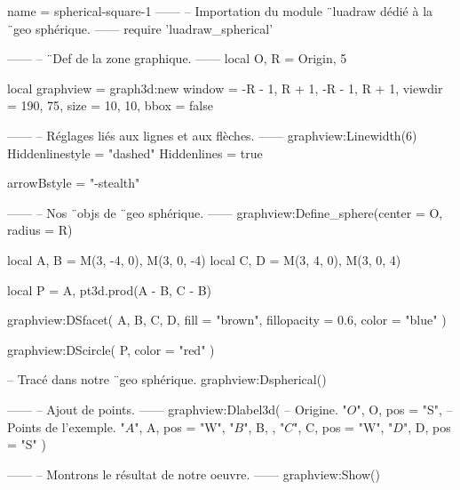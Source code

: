 \documentclass[border = 3pt]{standalone}
\begin{document}
\begin{luadraw*}{name = spherical-square-1}
------
-- Importation du module ¨luadraw dédié à la ¨geo sphérique.
------
require 'luadraw_spherical'

------
-- ¨Def de la zone graphique.
------
local O, R = Origin, 5

local graphview = graph3d:new{
  window  = {-R - 1, R + 1, -R - 1, R + 1},
  viewdir = {190, 75},
  size    = {10, 10},
  bbox    = false
}

------
-- Réglages liés aux lignes et aux flèches.
------
graphview:Linewidth(6)
Hiddenlinestyle = "dashed"
Hiddenlines     = true

arrowBstyle = "-stealth"

------
-- Nos ¨objs de ¨geo sphérique.
------
graphview:Define_sphere({center = O, radius = R})

local A, B = M(3, -4, 0), M(3, 0, -4)
local C, D = M(3, 4, 0), M(3, 0, 4)

local P = {A, pt3d.prod(A - B, C - B)}

graphview:DSfacet(
  {A, B, C, D},
  {fill = "brown", fillopacity = 0.6, color = "blue"}
)

graphview:DScircle(
  P,
  {color = "red"}
)

-- Tracé dans notre ¨geo sphérique.
graphview:Dspherical()

------
-- Ajout de points.
------
graphview:Dlabel3d(
-- Origine.
  "$O$", O, {pos = "S"},
-- Points de l'exemple.
  "$A$", A, {pos = "W"},
  "$B$", B, {},
  "$C$", C, {pos = "W"},
  "$D$", D, {pos = "S"}
)

------
-- Montrons le résultat de notre oeuvre.
------
graphview:Show()
\end{luadraw*}
\end{document}
